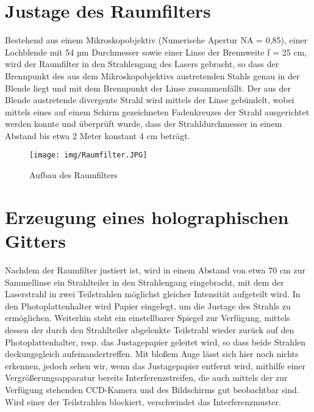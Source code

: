 \documentclass[bigchapter,colorback,accentcolor=tud4b,linedtoc,11pt]{tudreport}
\begin{document}
\section{Justage des Raumfilters}

Bestehend aus einem Mikroskopobjektiv (Numerische Apertur NA = 0,85), einer Lochblende mit 54 µm Durchmesser sowie einer Linse der Brennweite f = 25 cm, wird der Raumfilter in den Strahlengang des Lasers gebracht, so dass der Brennpunkt des aus dem Mikroskopobjektivs austretenden Stahls genau in der Blende liegt und mit dem Brennpunkt der Linse zusammenfällt. Der aus der Blende austretende divergente Strahl wird mittels der Linse gebündelt, wobei mittels eines auf einem Schirm gezeichneten Fadenkreuzes der Strahl ausgerichtet werden konnte und überprüft wurde, dass der Strahldurchmesser in einem Abstand bis etwa 2 Meter konstant 4 cm beträgt.

\begin{figure}[H]
\centering
\texttt{[image: img/Raumfilter.JPG]}
\caption{Aufbau des Raumfilters}
\end{figure}

\section{Erzeugung eines holographischen Gitters}

Nachdem der Raumfilter justiert ist, wird in einem Abstand von etwa 70 cm zur Sammellinse ein Strahlteiler in den Strahlengang eingebracht, mit dem der Laserstrahl in zwei Teilstrahlen möglichst gleicher Intensität aufgeteilt wird. In den Photoplattenhalter wird Papier eingelegt, um die Justage des Strahls zu ermöglichen. Weiterhin steht ein einstellbarer Spiegel zur Verfügung, mittels dessen der durch den Strahlteiler abgelenkte Teilstrahl wieder zurück auf den Photoplattenhalter, resp. das Justagepapier geleitet wird, so dass beide Strahlen deckungsgleich aufeinandertreffen. Mit bloßem Auge lässt sich hier noch nichts erkennen, jedoch sehen wir, wenn das Justagepapier entfernt wird, mithilfe einer Vergrößerungsapparatur bereits Interferenzstreifen, die auch mittels der zur Verfügung stehenden CCD-Kamera und des Bildschirms gut beobachtbar sind. Wird einer der Teilstrahlen blockiert, verschwindet das Interferenzmuster.
\end{document}
